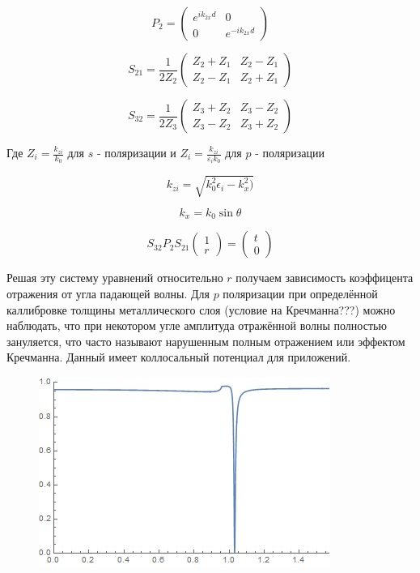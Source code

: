 $$P_{2}=\left(\begin{array}{cc}
e^{i k_{2 x} d} & 0 \\
0 & e^{-i k_{2 x} d}
\end{array}\right)$$



$$
S_{21} = 
\frac{1}{2 Z_2}\begin{pmatrix}
	Z_2+Z_1 & Z_2 -Z_1 \\
	Z_2-Z_1 & Z_2+Z_1
\end{pmatrix}
$$


$$
S_{32} = 
\frac{1}{2 Z_3}\begin{pmatrix}
Z_3+Z_2 & Z_3 -Z_2 \\
Z_3-Z_2 & Z_3+Z_2
\end{pmatrix}
$$

Где $Z_i = \frac{k_{zi}}{k_0}$ для $ s $ - поляризации и $Z_i = \frac{k_{zi}}{\varepsilon_i k_0}$ для $ p $ - поляризации 

$$
 k_{zi} = \sqrt{k_0^2 \epsilon_i - k_x^2)}
$$

$$
 k_{x} = k_0 \sin{ \theta}
$$


$$
S_{32} P_2 S_{21} \begin{pmatrix}
	1\\
	r 
\end{pmatrix} = 
\begin{pmatrix}
t\\
0 
\end{pmatrix}
$$


Решая эту систему уравнений относительно $ r $ получаем зависимость коэффицента отражения от угла падающей волны. Для $ p $ поляризации при определённой каллибровке толщины металлического слоя (условие на Кречманна???)
можно наблюдать, что при некотором угле амплитуда отражённой волны полностью зануляется, что часто называют нарушенным полным отражением или эффектом Кречманна.
Данный имеет коллосальный потенциал для приложений.

\begin{figure}[h!]
	\centering
	\includegraphics[width=0.5\linewidth]{kretchmann}
	\caption[Эффект Кречмана]{}
	\label{fig:kretchmann}
\end{figure}



